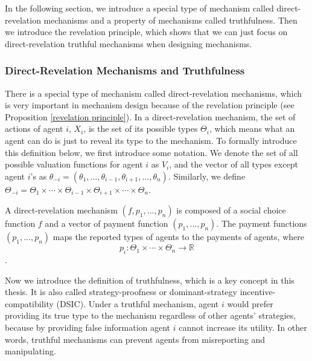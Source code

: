 \documentclass[11pt]{phdthesis}
\begin{document}
In the following section, we introduce a special type of mechanism called direct-revelation mechanisms and a property of mechanisms called truthfulness. Then we introduce the revelation principle, which shows that we can just focus on direct-revelation truthful mechanisms when designing mechanisms.

\subsubsection{Direct-Revelation Mechanisms and Truthfulness} \label{direct-revelation mechanisms and truthfulness}
There is a special type of mechanism called direct-revelation mechanisms, which is very important in mechanism design because of the revelation principle (see Proposition \ref{revelation principle}). In a direct-revelation mechanism, the set of actions of agent $i$, $X_i$, is the set of its possible types $ \Theta_i $, which means what an agent can do is just to reveal its type to the mechanism.  To formally introduce this definition below, we first introduce some notation. We denote the set of all possible valuation functions for agent $i$ as $V_i$, and the vector of all types except agent $i$'s as $\theta_{-i} = (\theta_1,\ldots,\theta_{i-1},\theta_{i+1},\ldots,\theta_n)$. Similarly, we define $\Theta_{-i} = \Theta_1 \times \cdots \times \Theta_{i-1} \times \Theta_{i+1} \times \cdots \times \Theta_n$.

\begin{definition} 
    A direct-revelation mechanism $(f,p_1,...,p_n)$ is composed of a social choice function $f$ and a vector of payment function $(p_1,...,p_n)$.
    The payment functions $(p_1,...,p_n)$ maps the reported types of agents to the payments of agents, where
    $$p_i : \Theta_1 \times \cdots \times \Theta_n \rightarrow \mathbb{R}$$
    \citep[Definition 9.14]{nisan2007algorithmic}.
\end{definition}

Now we introduce the definition of truthfulness, which is a key concept in this thesis. It is also called strategy-proofness or dominant-strategy incentive-compatibility (DSIC). Under a truthful mechanism, agent $i$ would prefer providing its true type to the mechanism regardless of other agents' strategies, because by providing false information agent $i$ cannot increase its utility. In other words, truthful mechanisms can prevent agents from misreporting and manipulating.
\end{document}
